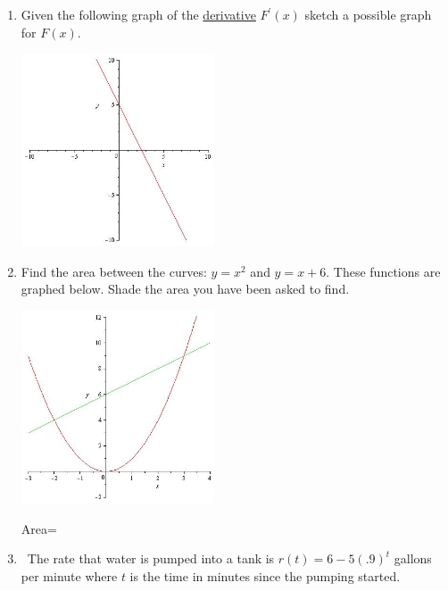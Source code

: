 \documentclass[12pt]{amsart}
\begin{document}
\begin{enumerate}
				
		\item  %
		Given the following graph of the \underline{derivative} $F^{\prime}(x)$ sketch a possible graph for $F(x)$.
		
		\vspace{.3in}
		
		\includegraphics [width=2.25in]{graphpbm28ex}
		
			\vspace{.3in}
			
		
		\item %
		
		Find the area between the curves: $y=x^2$ and $y=x+6$.  These functions are graphed below. Shade the area you have been asked to find.
		
			\vspace{.3in}
			
		\includegraphics [width=2.25in]{graphpbm29ex}
		
		\vspace{.3in}
	
			Area=\underline{\hspace {1in}}
		
		\vspace{.5in}


\item %
\  The rate that water is pumped into a tank is $r(t)=6-5(.9)^t$
gallons per minute where $t$ is the time in minutes since the pumping
started.  
     

\end{enumerate}
\end{document}

